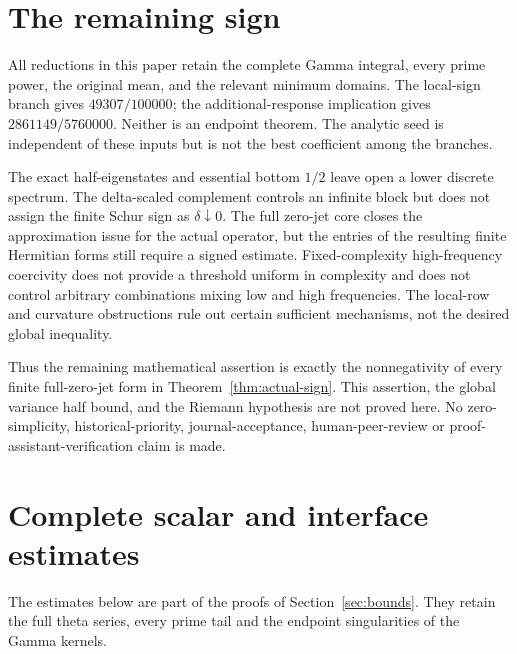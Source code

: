 \documentclass[11pt,a4paper]{article}
\numberwithin{equation}{section}
\theoremstyle{definition}\newtheorem{definition}[theorem]{Definition}
\theoremstyle{remark}\newtheorem{remark}[theorem]{Remark}
\begin{document}
\section{The remaining sign}\label{sec:remaining}
All reductions in this paper retain the complete Gamma integral, every prime power, the original mean, and the relevant minimum domains. The local-sign branch gives $49307/100000$; the additional-response implication gives $2861149/5760000$. Neither is an endpoint theorem. The analytic seed is independent of these inputs but is not the best coefficient among the branches.

The exact half-eigenstates and essential bottom $1/2$ leave open a lower discrete spectrum. The delta-scaled complement controls an infinite block but does not assign the finite Schur sign as $\delta\downarrow0$. The full zero-jet core closes the approximation issue for the actual operator, but the entries of the resulting finite Hermitian forms still require a signed estimate. Fixed-complexity high-frequency coercivity does not provide a threshold uniform in complexity and does not control arbitrary combinations mixing low and high frequencies. The local-row and curvature obstructions rule out certain sufficient mechanisms, not the desired global inequality.

Thus the remaining mathematical assertion is exactly the nonnegativity of every finite full-zero-jet form in Theorem~\ref{thm:actual-sign}. This assertion, the global variance half bound, and the Riemann hypothesis are not proved here. No zero-simplicity, historical-priority, journal-acceptance, human-peer-review or proof-assistant-verification claim is made.

\appendix
\section{Complete scalar and interface estimates}\label{app:costs}
The estimates below are part of the proofs of Section~\ref{sec:bounds}. They retain the full theta series, every prime tail and the endpoint singularities of the Gamma kernels.
\end{document}
